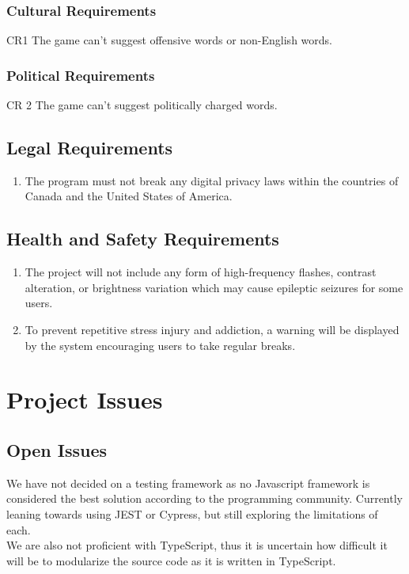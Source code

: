 \documentclass[12pt, titlepage]{article}
\begin{document}
	\subsubsection{Cultural Requirements}
	CR1 The game can't suggest offensive words or non-English words.
	
	\subsubsection{Political Requirements}
	CR 2 The game can't suggest politically charged words.
	
	\subsection{Legal Requirements}
	\begin{enumerate}[label=LR\arabic*]
		\item The program must not break any digital privacy laws within the 
		countries of 
		Canada 
		and the United States of America.
	\end{enumerate}
	\subsection{Health and Safety Requirements}
	\begin{enumerate}[label=HS\arabic*]
		\item The project will not include any form of high-frequency flashes, 
		contrast 
		alteration, or brightness variation which may cause epileptic seizures 
		for 
		some 
		users.
		\item To prevent repetitive stress injury and addiction, a warning will 
		be 
		displayed by the system encouraging users to take regular breaks.
	\end{enumerate}
	\section{Project Issues}
	
	\subsection{Open Issues} We have not decided on a testing framework as no
	Javascript framework is considered the best solution according to the
	programming community. Currently leaning towards using JEST or Cypress, but
	still exploring the limitations of each. \\
	We are also not proficient with TypeScript, thus it is uncertain how 
	difficult it will be to modularize the source code as it is written in 
	TypeScript. 
	
\end{document}
